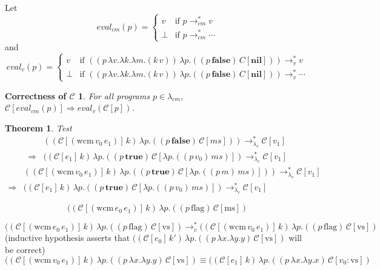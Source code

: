 \documentclass[ms,electronic,twosidetoc,letterpaper,chaptercenter,parttop]{byumsphd}
\begin{document}
Let
\[
eval_{cm}(p)=\begin{cases}
v     &\text{if $p\rightarrow_{cm}^{*}v$}\\
\perp &\text{if $p\rightarrow_{cm}^{*}\cdots$}
\end{cases}
\]
and
\[
eval_{v}(p)=\begin{cases}
v     &\text{if $((p\,\lambda v.\lambda k.\lambda m.(k\,v))\,\lambda p.((p\,\textbf{false})\,C[\textbf{nil}]))\rightarrow_{v}^{*}v$}\\
\perp &\text{if $((p\,\lambda v.\lambda k.\lambda m.(k\,v))\,\lambda p.((p\,\textbf{false})\,C[\textbf{nil}]))\rightarrow_{v}^{*}\cdots$}
\end{cases}
\]

\newtheorem{theorem}{Theorem}

\newtheorem*{maintheorem}{Correctness of $\mathcal{C}$}
\begin{maintheorem}
For all programs $p\in\lambda_{cm}$, $\mathcal{C}[eval_{cm}(p)]\Rightarrow eval_{v}(\mathcal{C}[p])$.
\end{maintheorem}

\begin{theorem}
Test
\begin{align*}
            &((\mathcal{C}[(\mathrm{wcm}\,v_0\,e_1)]\,k)\,\lambda p.((p\,\mathbf{false})\,\mathcal{C}[\mathit{ms}]))\rightarrow_{\lambda_{v}}^{*}\mathcal{C}[v_1]\\
\Rightarrow &((\mathcal{C}[e_1]\,k)\,\lambda p.((p\,\mathbf{true})\,\mathcal{C}[\lambda p.((p\,v_0)\,\mathit{ms})])\rightarrow_{\lambda_{v}}^{*}\mathcal{C}[v_1]
\end{align*}
\begin{align*}
            &((\mathcal{C}[(\mathrm{wcm}\,v_0\,e_1)]\,k)\,\lambda p.((p\,\mathbf{true})\,\mathcal{C}[\lambda p.((p\,m)\,\mathit{ms})]))\rightarrow_{\lambda_{v}}^{*}\mathcal{C}[v_1]\\
\Rightarrow &((\mathcal{C}[e_1]\,k)\,\lambda p.((p\,\mathbf{true})\,\mathcal{C}[\lambda p.((p\,v_0)\,\mathit{ms})])\rightarrow_{\lambda_{v}}^{*}\mathcal{C}[v_1]
\end{align*}
\end{theorem}

\[
((\mathcal{C}[(\mathrm{wcm}\,e_0\,e_1)]\,k)\,\lambda p.((p\,\mathrm{flag})\,\mathcal{C}[\mathrm{ms}])
\]

\[
((\mathcal{C}[(\mathrm{wcm}\,e_0\,e_1)]\,k)\,\lambda p.((p\,\mathrm{flag})\,\mathcal{C}[\mathrm{vs}])\rightarrow_{v}^{*}((\mathcal{C}[(\mathrm{wcm}\,v_0\,e_1)]\,k)\,\lambda p.((p\,\mathrm{flag})\,\mathcal{C}[\mathrm{vs}])
\]
(inductive hypothesis asserts that $((\mathcal{C}[e_0]\,k')\,\lambda p.((p\,\lambda x.\lambda y.y)\,\mathcal{C}[\mathrm{vs}])$ will be correct)
\[
((\mathcal{C}[(\mathrm{wcm}\,v_0\,e_1)]\,k)\,\lambda p.((p\,\lambda x.\lambda y.y)\,\mathcal{C}[\mathrm{vs}])\equiv((\mathcal{C}[e_1]\,k)\,\lambda p.((p\,\lambda x.\lambda y.x)\,\mathcal{C}[v_0 : \mathrm{vs}])
\]
\end{document}
